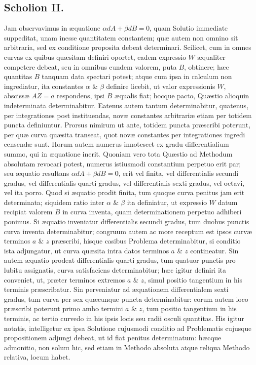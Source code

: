 \subsection*{Scholion II.}
Jam observavimus in æquatione $\alpha dA+\beta dB=0$, quam Solutio immediate suppeditat, unam inesse quantitatem constantem; quæ autem non omnino sit arbitraria, sed ex conditione proposita debeat determinari. Scilicet, cum in omnes curvas ex quibus quæsitam definiri oportet, eadem expressio $W$ æqualiter competere debeat, seu in omnibus eundem valorem, puta $B$, obtinere; hæc quantitas $B$ tanquam data spectari potest; atque cum ipsa in calculum non ingrediatur, ita constantes $\alpha$ \& $\beta$ definire licebit, ut valor expressionis $W$, abscissæ $AZ=a$ respondens, ipsi $B$ æqualis fiat; hocque pacto, Quæstio alioquin indeterminata determinabitur. Eatenus autem tantum determinabitur, quatenus, per integrationes post instituendas, novæ constantes arbitrariæ etiam per totidem puncta definiuntur. Prorsus nimirum ut ante, totidem puncta præscribi poterunt, per quæ curva quæsita transeat, quot novæ constantes per integrationes ingredi censendæ sunt. Horum autem numerus innotescet ex gradu differentialium summo, qui in æquatione inerit. Quoniam vero tota Quæstio ad Methodum absolutam revocari potest, numerus istiusmodi constantium perpetuo erit par; seu æquatio resultans $\alpha dA+\beta dB=0$, erit vel finita, vel differentialis secundi gradus, vel differentialis quarti gradus, vel differentialis sexti gradus, vel octavi, vel ita porro. Quod
si æquatio prodit finita, tum quoque curva penitus jam erit determinata; siquidem ratio inter $\alpha$ \& $\beta$ ita definiatur, ut expressio $W$ datum recipiat valorem $B$ in curva inventa, quam determinationem perpetuo adhiberi ponimus. Si æquatio inveniatur differentialis secundi gradus, tum duobus punctis curva inventa determinabitur; congruum autem ac more receptum est ipsos curvæ terminos $a$ \& $z$ præscribi, hisque casibus Problema determinabitur, si conditio ista adjungatur, ut curva quæsita intra datos terminos $a$ \& $z$ contineatur. Sin autem æquatio prodeat differentialis quarti gradus, tum quatuor punctis pro lubitu assignatis, curva satisfaciens determinabitur; hæc igitur definiri ita conveniet, ut, præter terminos extremos $a$ \& $z$, simul positio tangentium in his terminis præscribatur. Sin perveniatur ad æquationem differentialem sexti gradus, tum curva per sex quæcunque puncta determinabitur: eorum autem loco præscribi poterunt primo ambo termini $a$ \& $z$, tum positio tangentium in his terminis, ac tertio curvedo in his ipsis locis seu radii osculi quantitas. His igitur notatis, intelligetur ex ipsa Solutione cujusmodi conditio ad Problematis cujusque propositionem adjungi debeat, ut id fiat penitus determinatum: hæcque admonitio, non solum hic, sed etiam in Methodo absoluta atque reliqua Methodo relativa, locum habet.

